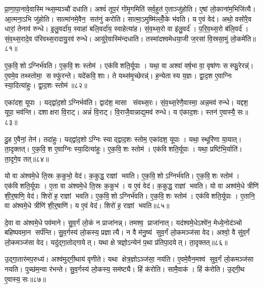 प्रा॒णा॒पा॒नावे॒वास्मिन्थ्स॒म्यञ्चौ॑ दधाति। अश्वं॑ तूप॒रं गो॑मृ॒गमिति॑ सर्व॒हुत॑ ए॒ताञ्जु॑होति। ए॒षां लो॒काना॑म॒भिजि॑त्यै। आ॒त्मना॒ऽभि जु॑होति। सात्मा॑नमे॒वैन॒ सत॑नुं करोति। सात्मा॒ऽमुष्मि॑ल्लोँ॒के भ॑वति। य ए॒वं वेद॑। अथो॒ वसो॑रे॒व धारां॒ तेनाव॑ रुन्धे। इ॒लु॒वर्दा॑य॒ स्वाहा॑ बलि॒वर्दा॑य॒ स्वाहेत्या॑ह। सं॒व॒थ्स॒रो वा इ॑लु॒वर्द॑। प॒रि॒व॒थ्स॒रो ब॑लि॒वर्द॑। सं॒व॒थ्स॒रादे॒व प॑रिवथ्स॒रादायु॒रव॑ रुन्धे। आयु॑रे॒वास्मि॑न्दधाति। तस्मा॑दश्वमेधया॒जी ज॒रसा॑ वि॒स्रसा॒मुं लो॒कमे॑ति॥८१॥\anuvakamend[तेज॒सोऽव॑रुध्यै भव॒न्त्यश्वो॑ गोमृ॒गमि॑लु॒वर्द॑श्च॒त्वारि॑ च]

ए॒क॒वि॒शोऽग्निर्भ॑वति। ए॒क॒वि॒शः स्तोम॑। एक॑विशति॒र्यूपाः। यथा॒ वा अश्वा॑ वर्\mbox{}ष॒भा वा॒ वृषा॑णः सस्फु॒रेरन्न्॑। ए॒वमे॒व तथ्स्तोमा॒ सस्फु॑रन्ते। यदे॑कवि॒शाः। ते यथ्स॑मृ॒च्छेरन्न्॑। ह॒न्येतास्य य॒ज्ञः। द्वा॒द॒श ए॒वाग्निः स्या॒दित्या॑हुः। द्वा॒द॒शः स्तोम॑॥८२॥

एका॑दश॒ यूपाः। यद्द्वा॑द॒शोऽग्निर्भव॑ति। द्वाद॑श॒ मासा संवथ्स॒रः। सं॒व॒थ्स॒रेणै॒वास्मा॒ अन्न॒मव॑ रुन्धे। यद्दश॒ यूपा॒ भव॑न्ति। दशाक्षरा वि॒राट्। अन्नं॑ वि॒राट्। वि॒राजै॒वान्नाद्य॒मव॑ रुन्धे। य ए॑काद॒शः। स्तन॑ ए॒वास्यै॒ सः॥८३॥

दु॒ह ए॒वैनां॒ तेन॑। तदा॑हुः। यद्द्वा॑द॒शोऽग्निः स्याद्द्वाद॒शः स्तोम॒ एका॑दश॒ यूपाः। यथा॒ स्थूरि॑णा या॒यात्। ता॒दृक्तत्। ए॒क॒वि॒श ए॒वाग्निः स्या॒दित्या॑हुः। ए॒क॒वि॒शः स्तोम॑। एक॑विशति॒र्यूपाः। यथा॒ प्रष्टि॑भि॒र्याति॑। ता॒दृगे॒व तत्॥८४॥

यो वा अ॑श्वमे॒धे ति॒स्रः क॒कुभो॒ वेद॑। क॒कुद्ध॒ राज्ञां भवति। ए॒क॒वि॒शोऽग्निर्भ॑वति। ए॒क॒वि॒शः स्तोम॑। एक॑विशति॒र्यूपाः। ए॒ता वा अ॑श्वमे॒धे ति॒स्रः क॒कुभ॑। य ए॒वं वेद॑। क॒कुद्ध॒ राज्ञां भवति। यो वा अश्व॑मे॒धे त्रीणि॑ शी॒र्॒षाणि॒ वेद॑। शिरो॑ ह॒ राज्ञां भवति। ए॒क॒वि॒शोऽग्निर्भ॑वति। ए॒क॒वि॒शः स्तोम॑। एक॑विशति॒र्यूपाः। ए॒तानि॒ वा अ॑श्वमे॒धे त्रीणि॑ शी॒र्॒षाणि॑। य ए॒वं वेद॑। शिरो॑ ह॒ राज्ञां भवति॥८५॥\anuvakamend[द्वा॒द॒शः स्तोम॒ स ए॒व तच्छिरो॑ ह॒ राज्ञां भवति॒ षट् च॑]

दे॒वा वा अ॑श्वमे॒धे पव॑माने। सु॒व॒र्गं लो॒कं न प्राजा॑नन्न्। तमश्व॒ प्राजा॑नात्। यद॑श्वमे॒धेऽश्वे॑न॒ मेध्ये॒नोद॑ञ्चो बहिष्पवमा॒न सर्प॑न्ति। सु॒व॒र्गस्य॑ लो॒कस्य॒ प्रज्ञात्यै। न वै म॑नु॒ष्य॑ सुव॒र्गं लो॒कमञ्ज॑सा वेद। अश्वो॒ वै सु॑व॒र्गं लो॒कमञ्ज॑सा वेद। यदु॑द्गा॒तोद्गायेत्। यथा क्षेत्रज्ञो॒ऽन्येन॑ प॒था प्र॑तिपा॒दयेत्। ता॒दृक्तत्॥८६॥

उ॒द्गा॒तार॑मप॒रुध्य॑। अश्व॑मुद्गी॒थाय॑ वृणीते। यथा क्षेत्र॒ज्ञोऽञ्ज॑सा॒ नय॑ति। ए॒वमे॒वैन॒मश्व॑ सुव॒र्गं लो॒कमञ्ज॑सा नयति। पुच्छ॑म॒न्वा र॑भन्ते। सु॒व॒र्गस्य॑ लो॒कस्य॒ सम॑ष्ट्यै। हिं क॑रोति। सामै॒वाक॑। हिं क॑रोति। उ॒द्गी॒थ ए॒वास्य॒ सः॥८७॥

